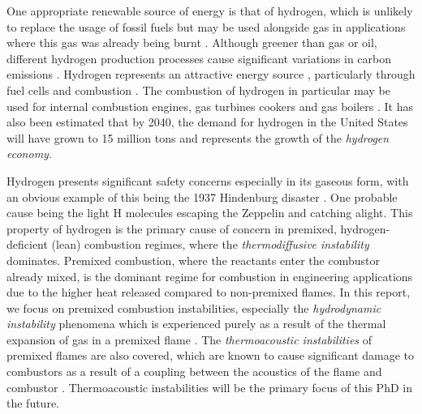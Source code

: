 One appropriate renewable source of energy is that of hydrogen, which is unlikely to replace the usage of fossil fuels but may be used alongside gas in applications where this gas was already being burnt \cite{momirlan2005PropertiesHydrogenFuel}. Although greener than gas or oil, different hydrogen production processes \cite{dasilvaveras2017HydrogenTrendsProduction} cause significant variations in carbon emissions \cite{nationalgrid2022HeatingOurHomes}. Hydrogen represents an attractive energy source \cite{momirlan2005PropertiesHydrogenFuel}, particularly through fuel cells \cite{momirlan2005PropertiesHydrogenFuel} and combustion \cite{lanz2001ModuleHydrogenUse, stepien2021ComprehensiveOverviewHydrogenFueled}. The combustion of hydrogen in particular may be used for internal combustion engines, gas turbines cookers and gas boilers \cite{momirlan2005PropertiesHydrogenFuel}. It has also been estimated that by 2040, the demand for hydrogen in the United States will have grown to 15 million tons \cite{molkov2007HydrogenSafetyResearch} and represents the growth of the \emph{hydrogen economy}.

Hydrogen presents significant safety concerns \cite{green2006HydrogenSafetyIssues} especially in its gaseous form, with an obvious example of this being the 1937 Hindenburg disaster \cite{dilisi2017HindenburgDisasterCombining}. One probable cause being the light H molecules escaping the Zeppelin and catching alight. This property of hydrogen is the primary cause of concern in premixed, hydrogen-deficient (lean) combustion regimes, where the \emph{thermodiffusive instability} dominates. Premixed combustion, where the reactants enter the combustor already mixed, is the dominant regime for combustion in engineering applications due to the higher heat released compared to non-premixed flames. In this report, we focus on premixed combustion instabilities, especially the \emph{hydrodynamic instability} phenomena which is experienced purely as a result of the thermal expansion of gas in a premixed flame \cite{matalon2018DarrieusLandauInstability}. The \emph{thermoacoustic instabilities} of premixed flames are also covered, which are known to cause significant damage to combustors as a result of a coupling between the acoustics of the flame and combustor \cite{morgans2024ThermoacousticInstabilityCombustors}. Thermoacoustic instabilities will be the primary focus of this PhD in the future.

